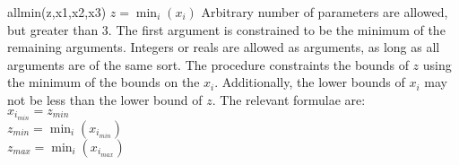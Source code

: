     {allmin(z,x1,x2,x3)}
    {$z=\min_i(x_i)$}
    {Arbitrary number of parameters are allowed, but greater than 3.  
    The first argument is constrained to be the minimum of the remaining 
    arguments.}
    {Integers or reals are allowed as arguments, as long as all arguments
    are of the same sort.}
    {The procedure constraints the bounds of $z$
    using the minimum of the bounds on the $x_i$.  Additionally, the lower bounds
    of $x_i$ may not be less than the lower bound of $z$.  The relevant
    formulae are:\\
    $x_{i_{min}} = z_{min}$\\
    $z_{min} = \min_i(x_{i_{min}})$\\
    $z_{max} = \min_i(x_{i_{max}})$}



